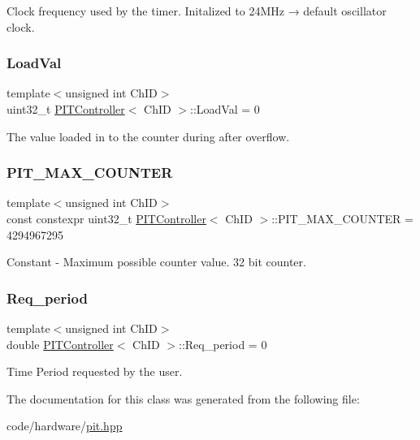 Clock frequency used by the timer. Initalized to 24\+M\+Hz → default oscillator clock. 

\mbox{\label{classPITController_ad253f0ac646573e5b08e050b6fab5e32}} 
\subsubsection{\texorpdfstring{Load\+Val}{LoadVal}}
{\footnotesize\ttfamily template$<$unsigned int Ch\+ID$>$ \\
uint32\+\_\+t \hyperlink{classPITController}{P\+I\+T\+Controller}$<$ Ch\+ID $>$\+::Load\+Val = 0}



The value loaded in to the counter during after overflow. 

\mbox{\label{classPITController_a53778fe7e47ac9741bef0bc190e0646a}} 
\subsubsection{\texorpdfstring{P\+I\+T\+\_\+\+M\+A\+X\+\_\+\+C\+O\+U\+N\+T\+ER}{PIT\_MAX\_COUNTER}}
{\footnotesize\ttfamily template$<$unsigned int Ch\+ID$>$ \\
const constexpr uint32\+\_\+t \hyperlink{classPITController}{P\+I\+T\+Controller}$<$ Ch\+ID $>$\+::P\+I\+T\+\_\+\+M\+A\+X\+\_\+\+C\+O\+U\+N\+T\+ER = 4294967295\hspace{0.3cm}{\ttfamily [static]}}



Constant -\/ Maximum possible counter value. 32 bit counter. 

\mbox{\label{classPITController_a9de0af49a52145c8d2a8f4e90a519b60}} 
\subsubsection{\texorpdfstring{Req\+\_\+period}{Req\_period}}
{\footnotesize\ttfamily template$<$unsigned int Ch\+ID$>$ \\
double \hyperlink{classPITController}{P\+I\+T\+Controller}$<$ Ch\+ID $>$\+::Req\+\_\+period = 0}



Time Period requested by the user. 



The documentation for this class was generated from the following file\+:\begin{DoxyCompactItemize}
\item 
code/hardware/\hyperlink{pit_8hpp}{pit.\+hpp}\end{DoxyCompactItemize}
